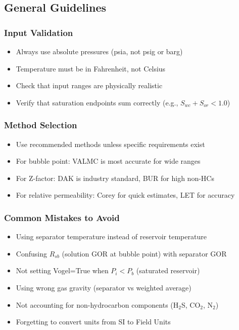\documentclass[11pt,a4paper]{article}
\begin{document}
\subsection{General Guidelines}

\subsubsection{Input Validation}
\begin{itemize}
\item Always use absolute pressures (psia, not psig or barg)
\item Temperature must be in Fahrenheit, not Celsius
\item Check that input ranges are physically realistic
\item Verify that saturation endpoints sum correctly (e.g., $S_{wc} + S_{or} < 1.0$)
\end{itemize}

\subsubsection{Method Selection}
\begin{itemize}
\item Use recommended methods unless specific requirements exist
\item For bubble point: VALMC is most accurate for wide ranges
\item For Z-factor: DAK is industry standard, BUR for high non-HCs
\item For relative permeability: Corey for quick estimates, LET for accuracy
\end{itemize}

\subsubsection{Common Mistakes to Avoid}
\begin{itemize}
\item Using separator temperature instead of reservoir temperature
\item Confusing $R_{sb}$ (solution GOR at bubble point) with separator GOR
\item Not setting Vogel=True when $P_i < P_b$ (saturated reservoir)
\item Using wrong gas gravity (separator vs weighted average)
\item Not accounting for non-hydrocarbon components (H$_2$S, CO$_2$, N$_2$)
\item Forgetting to convert units from SI to Field Units
\end{itemize}
\end{document}
